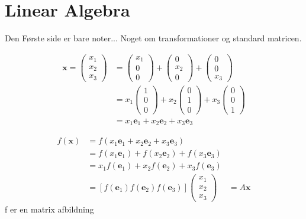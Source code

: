 \chapter {Linear Algebra} 
Den Første side er bare noter...
Noget om transformationer og standard matricen.

\begin{align*}
    \textbf{x}=
    \begin{pmatrix}x_1 
        \\x_2 \\ x_3 
    \end{pmatrix} &= 
    \begin{pmatrix}
        x_1 \\ 0 \\ 0  
    \end{pmatrix} + 
    \begin{pmatrix}
        0 \\ x_2 \\ 0  
    \end{pmatrix} + 
    \begin{pmatrix}
        0 \\ 0 \\ x_3  
    \end{pmatrix}\\ &= x_1  
   \begin{pmatrix}
        1 \\ 0\\ 0  
   \end{pmatrix}+ x_2 
   \begin{pmatrix}
        0 \\ 1 \\ 0  
   \end{pmatrix} + x_3 
   \begin{pmatrix}
        0 \\ 0 \\ 1  
   \end{pmatrix} \\ &= x_1 \textbf{e}_1 + x_2\textbf{e}_2+x_3 \textbf{e}_3
\end{align*}

\begin{align*}
f(\textbf{x})&=f(x_1 \textbf{e}_1 + x_2\textbf{e}_2+x_3 \textbf{e}_3)\\ 
&= f(x_1 \textbf{e}_1) + f(x_2 \textbf{e}_2) + f(x_3 \textbf{e}_3) \\
&=x_1 f(\textbf{e}_1) + x_2 f(\textbf{e}_2) + x_3 f(\textbf{e}_3)
\\ &= [f(\textbf{e}_1) f(\textbf{e}_2 ) f(\textbf{e}_3)] 
\begin{pmatrix}
    x_1 \\x_2 \\ x_3 
\end{pmatrix} &= A \textbf{x}
\end{align*}
f er en matrix afbildning

